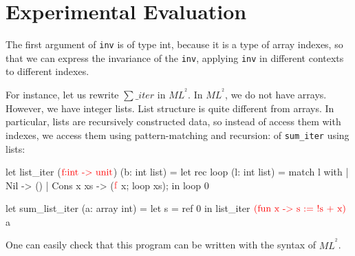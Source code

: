 \documentclass[a4paper,11pt,oneside]{article}
\theoremstyle{plain}
\newcommand{\inlsrc}{\textit{ML}^{^2}}
\begin{document}

\newpage
\section{Experimental Evaluation}

 The first argument of \texttt{inv} is of type int, because it is a type of array indexes, so that we can express the invariance of the \texttt{inv}, applying \texttt{inv} in different contexts to different indexes.
  
	For instance, let us rewrite $\sum\_iter$ in $\inlsrc$.
	In $\inlsrc$, we do not have arrays. However, we have integer lists. 
 List structure is quite different from arrays. 
 In particular, lists are recursively constructed data, so instead of access them with indexes, we access them using pattern-matching and recursion:	
	of \texttt{sum\_iter} using lists: \hypertarget{sum-list-iter}{}
	
\begin{small}
	\begin{minipage}[t]{0.4\linewidth}	
	\begin{whycode}  
let list_iter ($\textcolor{red}{\text{f:int -> unit}}$) (b: int list)   
 = let rec loop (l: int list) = 
      match l with 
       | Nil       -> ()
       | Cons x xs -> ($\textcolor{red}{\text{f}}$ x; loop xs); 
   in loop 0 
   
   let sum_list_iter (a: array int) =		 
     let s = ref 0 in
     list_iter $\textcolor{red}{\text{(fun x -> s := !s + x)}}$ a     
 	\end{whycode}
 	\end{minipage}
 \end{small}	

One can easily check that this program can be written with the syntax of $\inlsrc$.


 	



\end{document}
